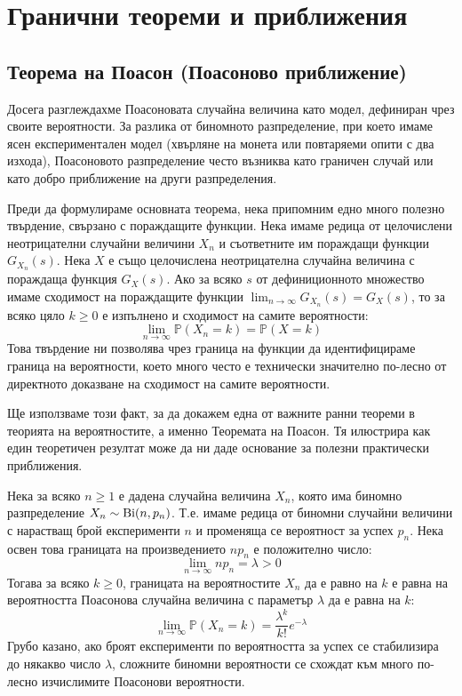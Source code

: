 \section{Гранични теореми и приближения}

\subsection{Теорема на Поасон (Поасоново приближение)}

Досега разглеждахме Поасоновата случайна величина като модел, дефиниран чрез своите вероятности. За разлика от биномното разпределение, при което имаме ясен експериментален модел (хвърляне на монета или повтаряеми опити с два изхода), Поасоновото разпределение често възниква като граничен случай или като добро приближение на други разпределения.

Преди да формулираме основната теорема, нека припомним едно много полезно твърдение, свързано с пораждащите функции. Нека имаме редица от целочислени неотрицателни случайни величини $X_n$ и съответните им пораждащи функции $G_{X_n}(s)$. Нека $X$ е също целочислена неотрицателна случайна величина с пораждаща функция $G_X(s)$. Ако за всяко $s$ от дефиниционното множество имаме сходимост на пораждащите функции $\lim_{n \to \infty} G_{X_n}(s) = G_X(s)$, то за всяко цяло $k \ge 0$ е изпълнено и сходимост на самите вероятности:
\[
\lim_{n \to \infty} \mathbb{P}(X_n = k) = \mathbb{P}(X = k)
\]
Това твърдение ни позволява чрез граница на функции да идентифицираме граница на вероятности, което много често е технически значително по-лесно от директното доказване на сходимост на самите вероятности.

Ще използваме този факт, за да докажем една от важните ранни теореми в теорията на вероятностите, а именно Теоремата на Поасон. Тя илюстрира как един теоретичен резултат може да ни даде основание за полезни практически приближения.

\begin{keythm}[на Поасон]
Нека за всяко $n \ge 1$ е дадена случайна величина $X_n$, която има биномно разпределение $X_n \sim \operatorname{Bi}(n, p_n)$. Т.е. имаме редица от биномни случайни величини с нарастващ брой експерименти $n$ и променяща се вероятност за успех $p_n$. Нека освен това границата на произведението $n p_n$ е положително число:
\[
\lim_{n \to \infty} n p_n = \lambda > 0
\]
Тогава за всяко $k \ge 0$, границата на вероятностите $X_n$ да е равно на $k$ е равна на вероятността Поасонова случайна величина с параметър $\lambda$ да е равна на $k$:
\[
\lim_{n \to \infty} \mathbb{P}(X_n = k) = \frac{\lambda^k}{k!} e^{-\lambda}
\]
Грубо казано, ако броят експерименти по вероятността за успех се стабилизира до някакво число $\lambda$, сложните биномни вероятности се схождат към много по-лесно изчислимите Поасонови вероятности.
\end{keythm}

